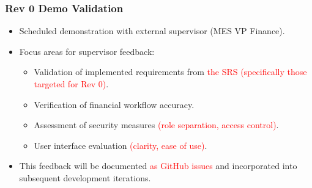 \documentclass[12pt, titlepage]{article}
\begin{document}
\subsubsection*{Rev 0 Demo Validation}
\begin{itemize}
   \item Scheduled demonstration with external supervisor (MES VP Finance).
   \item Focus areas for supervisor feedback:
   \begin{itemize}
       \item Validation of implemented requirements from \textcolor{red}{the SRS (specifically those targeted for Rev 0)}.
       \item Verification of financial workflow accuracy.
       \item Assessment of security measures \textcolor{red}{(role separation, access control)}.
       \item User interface evaluation \textcolor{red}{(clarity, ease of use)}.
   \end{itemize}
   \item This feedback will be documented \textcolor{red}{as GitHub issues} and incorporated into subsequent development iterations.
\end{itemize}
\end{document}
